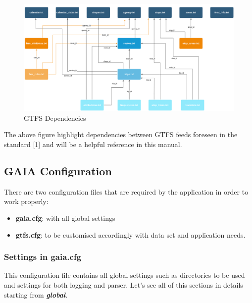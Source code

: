 \documentclass[12pt, a4paper]{book}
\begin{document}
\begin{figure}[h]
    \centering
    \includegraphics[width=1.0\textwidth]{images/GTFS_Diagram.png}
    \caption{GTFS Dependencies}
    \label{fig:figure1}
\end{figure}

\begin{justify}
The above figure highlight dependencies between GTFS feeds foreseen in the standard [1] and will be a helpful reference in this manual.
\end{justify}



\newpage
\subsection{GAIA Configuration}

\begin{justify}
There are two configuration files that are required by the application in order to work properly:
\begin{itemize}
\item \textbf{gaia.cfg}: with all global settings
\item \textbf{gtfs.cfg}: to be customised accordingly with data set and application needs.
\end{itemize}
\end{justify}

\subsubsection{Settings in \textbf{gaia.cfg}}

\begin{justify}
This configuration file contains all global settings such as directories to be used and settings for both logging and parser.
Let's see all of this sections in details starting from \textbf{\textit{global}}.
\end{justify}
\end{document}
